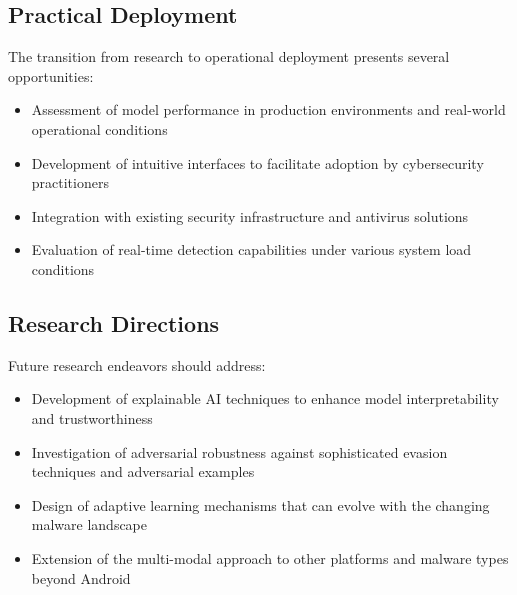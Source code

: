\documentclass[a4paper,11pt]{article}
\begin{document}
\subsection{Practical Deployment}
The transition from research to operational deployment presents several opportunities:
\begin{itemize}
    \item Assessment of model performance in production environments and real-world operational conditions
    \item Development of intuitive interfaces to facilitate adoption by cybersecurity practitioners
    \item Integration with existing security infrastructure and antivirus solutions
    \item Evaluation of real-time detection capabilities under various system load conditions
\end{itemize}

\subsection{Research Directions}
Future research endeavors should address:
\begin{itemize}
    \item Development of explainable AI techniques to enhance model interpretability and trustworthiness
    \item Investigation of adversarial robustness against sophisticated evasion techniques and adversarial examples
    \item Design of adaptive learning mechanisms that can evolve with the changing malware landscape
    \item Extension of the multi-modal approach to other platforms and malware types beyond Android
\end{itemize}

\onecolumn
\newpage
\printbibliography[heading=bibintoc,title={References}]
\end{document}
